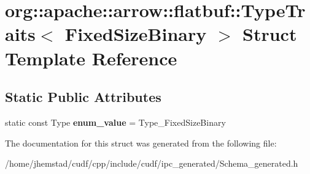 \hypertarget{structorg_1_1apache_1_1arrow_1_1flatbuf_1_1TypeTraits_3_01FixedSizeBinary_01_4}{}\section{org\+:\+:apache\+:\+:arrow\+:\+:flatbuf\+:\+:Type\+Traits$<$ Fixed\+Size\+Binary $>$ Struct Template Reference}
\label{structorg_1_1apache_1_1arrow_1_1flatbuf_1_1TypeTraits_3_01FixedSizeBinary_01_4}
\subsection*{Static Public Attributes}
\begin{DoxyCompactItemize}
\item 
static const Type {\bfseries enum\+\_\+value} = Type\+\_\+\+Fixed\+Size\+Binary\hypertarget{structorg_1_1apache_1_1arrow_1_1flatbuf_1_1TypeTraits_3_01FixedSizeBinary_01_4_ab94c258da68d7f81ccde0d203ee1ef7b}{}\label{structorg_1_1apache_1_1arrow_1_1flatbuf_1_1TypeTraits_3_01FixedSizeBinary_01_4_ab94c258da68d7f81ccde0d203ee1ef7b}

\end{DoxyCompactItemize}


The documentation for this struct was generated from the following file\+:\begin{DoxyCompactItemize}
\item 
/home/jhemstad/cudf/cpp/include/cudf/ipc\+\_\+generated/Schema\+\_\+generated.\+h\end{DoxyCompactItemize}
